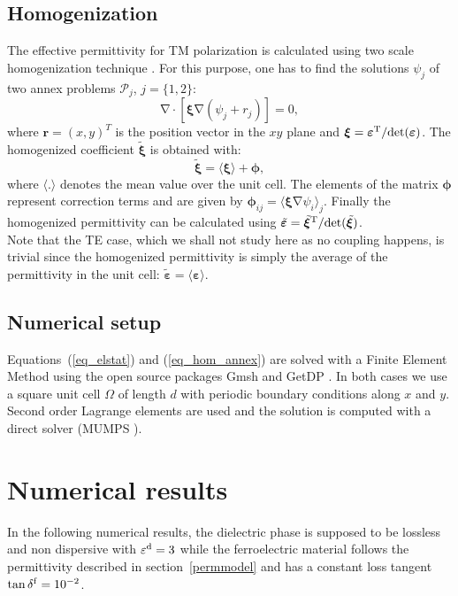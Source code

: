 \documentclass[openacc]{rsproca_new}%
\newcommand{\B}{\boldsymbol}
\newcommand{\tens}[1]{\B{#1}}
\newcommand{\grad}{\B{\mathrm{\nabla}}}
\renewcommand{\div}{\B{\mathrm{\nabla\cdotp}}}
\newcommand{\epstens}{\tens{\varepsilon}}
\newcommand{\epsd}{\varepsilon^{\rm d}}
\newcommand{\epshom}{\tilde{\epstens}}
\newcommand{\xitens}{\tens{\xi}}
\newcommand{\xihom}{\tilde{\xitens}}
\begin{document}
\subsection{Homogenization}
The effective permittivity for TM polarization is calculated
using two scale homogenization technique \cite{Allaire92, Guenneau2000}.
For this purpose, one has to find the solutions
$\psi_j$ of two annex problems $\mathcal P_j$, $j=\{1, 2\}$:
\begin{equation}
\div \left[ \xitens \grad(\psi_j + r_j) \right] = 0,
\label{eq_hom_annex}
\end{equation}
where $\B r = (x, y)^T$ is the position vector in the $xy$ plane and
$\xitens=\epstens^{\rm T}/ {\rm det }(\epstens)$.
The homogenized coefficient $\xihom$ is obtained with:
\begin{equation}
\xihom = \langle \xitens \rangle + \B \phi,
\label{eq_hom}
\end{equation}
where $\langle . \rangle$ denotes the mean value over the unit cell.
The elements of the matrix $\B \phi$ represent correction terms and
are given by $\B \phi_{ij} = \langle \xitens \grad \psi_i \rangle_j$.
Finally the homogenized permittivity  can be calculated using $\epshom=\xihom^{\rm T}/ {\rm det }(\xihom)$.\\
Note that the TE case, which we shall not study here as no coupling happens, is trivial since
the homogenized permittivity is simply the average of the permittivity in the unit cell:
$\epshom = \langle \epstens \rangle$.


\subsection{Numerical setup}
Equations~(\ref{eq_elstat}) and (\ref{eq_hom_annex}) are solved with a Finite Element
Method using the open source packages Gmsh \cite{gmsh} and GetDP \cite{getdp}.
In both cases we use a square unit cell $\Omega$ of length $d$ with periodic boundary
conditions along $x$ and $y$. Second order Lagrange elements are used and the
solution is computed with a direct solver (MUMPS \cite{MUMPS}).



\section{Numerical results}
In the following numerical results, the dielectric phase is supposed to be
lossless and non dispersive with $\epsd = 3$ while the ferroelectric material follows the
permittivity described in section~\ref{permmodel} and has a constant loss
tangent $\tan \delta^{\rm f} = 10^{-2}$.
\end{document}
